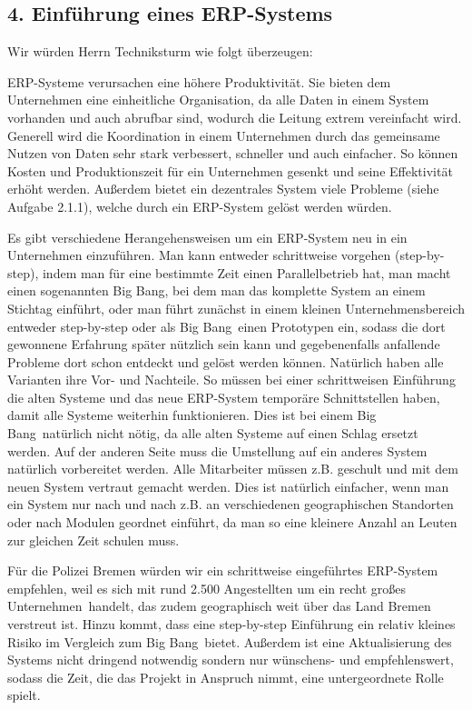 \documentclass[12pt,utf8]{scrartcl}
\begin{document}
{\subsection*{4. Einführung eines ERP-Systems}

Wir würden Herrn Techniksturm wie folgt überzeugen:

ERP-Systeme verursachen eine höhere Produktivität. Sie bieten dem Unternehmen eine einheitliche Organisation, da alle Daten in einem System vorhanden und auch abrufbar sind, wodurch die Leitung extrem vereinfacht wird. Generell wird die Koordination in einem Unternehmen durch das gemeinsame Nutzen von Daten sehr stark verbessert, schneller und auch einfacher. So können Kosten und Produktionszeit für ein Unternehmen gesenkt und seine Effektivität erhöht werden\cite{Nwankpa2015}. Außerdem bietet ein dezentrales System viele Probleme (siehe Aufgabe 2.1.1), welche durch ein ERP-System gelöst werden würden. 

Es gibt verschiedene Herangehensweisen um ein ERP-System neu in ein Unternehmen einzuführen. Man kann entweder schrittweise vorgehen (step-by-step), indem man für eine bestimmte Zeit einen Parallelbetrieb hat, man macht einen sogenannten \glqq Big Bang\grqq, bei dem man das komplette System an einem Stichtag einführt, oder man führt zunächst in einem kleinen Unternehmensbereich entweder step-by-step oder als \glqq Big Bang\grqq\ einen Prototypen ein, sodass die dort gewonnene Erfahrung später nützlich sein kann und gegebenenfalls anfallende Probleme dort schon entdeckt und gelöst werden können. Natürlich haben alle Varianten ihre Vor- und Nachteile. So müssen bei einer schrittweisen Einführung die alten Systeme und das neue ERP-System temporäre Schnittstellen haben, damit alle Systeme weiterhin funktionieren. Dies ist bei einem \glqq Big Bang\grqq\ natürlich nicht nötig, da alle alten Systeme auf einen Schlag ersetzt werden. Auf der anderen Seite muss die Umstellung auf ein anderes System natürlich vorbereitet werden. Alle Mitarbeiter müssen z.B. geschult und mit dem neuen System vertraut gemacht werden. Dies ist natürlich einfacher, wenn man ein System nur nach und nach z.B. an verschiedenen geographischen Standorten oder nach Modulen geordnet einführt, da man so eine kleinere Anzahl an Leuten zur gleichen Zeit schulen muss\cite{Jacob2008}. 

Für die Polizei Bremen würden wir ein schrittweise eingeführtes ERP-System empfehlen, weil es sich mit rund 2.500 Angestellten um ein recht großes \glqq Unternehmen\grqq\ handelt, das zudem geographisch weit über das Land Bremen verstreut ist\cite{PolizeiBremen}. Hinzu kommt, dass eine step-by-step Einführung ein relativ kleines Risiko im Vergleich zum \glqq Big Bang\grqq\ bietet. Außerdem ist eine Aktualisierung des Systems nicht dringend notwendig sondern nur wünschens- und empfehlenswert, sodass die Zeit, die das Projekt in Anspruch nimmt, eine untergeordnete Rolle spielt\cite{Hansmann2005}. 

}
\end{document}
